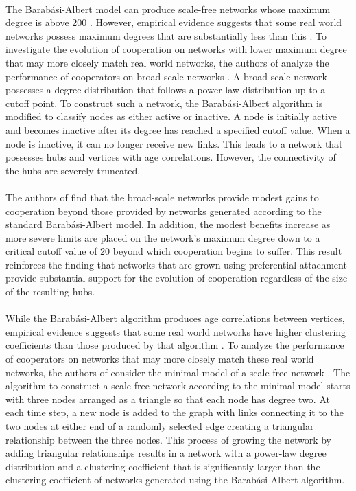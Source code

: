 \documentclass{article}
\begin{document}
	\paragraph{}The Barab\'{a}si-Albert model can produce scale-free networks whose maximum degree is above 200 \cite{Santos2006a}.  However, empirical evidence suggests that some real world networks possess maximum degrees that are substantially less than this \cite{Dorogovtsev2003}.  To investigate the evolution of cooperation on networks with lower maximum degree that may more closely match real world networks, the authors of \cite{Santos2006a} analyze the performance of cooperators on broad-scale networks \cite{Amaral2000}.  A broad-scale network possesses a degree distribution that follows a power-law distribution up to a cutoff point.  To construct such a network, the Barab\'{a}si-Albert algorithm is modified to classify nodes as either active or inactive.  A node is initially active and becomes inactive after its degree has reached a specified cutoff value.  When a node is inactive, it can no longer receive new links.  This leads to a network that possesses hubs and vertices with age correlations.  However, the connectivity of the hubs are severely truncated. 
	\paragraph{}The authors of \cite{Santos2006a} find that the broad-scale networks provide modest gains to cooperation beyond those provided by networks generated according to the standard Barab\'{a}si-Albert model.  In addition, the modest benefits increase as more severe limits are placed on the network's maximum degree down to a critical cutoff value of $20$ beyond which cooperation begins to suffer.  This result reinforces the finding that networks that are grown using preferential attachment provide substantial support for the evolution of cooperation regardless of the size of the resulting hubs.
	\paragraph{}While the Barab\'{a}si-Albert algorithm produces age correlations between vertices, empirical evidence suggests that some real world networks have higher clustering coefficients than those produced by that algorithm \cite{Dorogovtsev2003}.  To analyze the performance of cooperators on networks that may more closely match these real world networks, the authors of \cite{Santos2006a} consider the minimal model of a scale-free network \cite{Dorogovtsev2001}.  The algorithm to construct a scale-free network according to the minimal model starts with three nodes arranged as a triangle so that each node has degree two.  At each time step, a new node is added to the graph with links connecting it to the two nodes at either end of a randomly selected edge creating a triangular relationship between the three nodes.  This process of growing the network by adding triangular relationships results in a network with a power-law degree distribution and a clustering coefficient that is significantly larger than the clustering coefficient of networks generated using the Barab\'{a}si-Albert algorithm.
\end{document}
